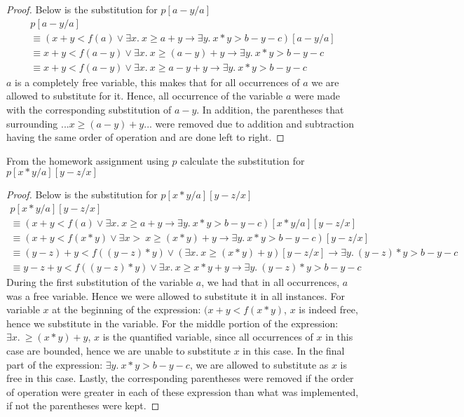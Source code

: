 \documentclass[12pt]{article}
\newenvironment{exercise}[2][Exercise]{\begin{trivlist}
\item[\hskip \labelsep {\bfseries #1}\hskip \labelsep {\bfseries #2.}]}{\end{trivlist}}
\begin{document}
\begin{proof}
Below is the substitution for $p[a-y/a]$
\begin{gather*}
    p[a-y/a] \\ 
     \equiv (x+y < f(a) \lor \exists x .\: x \geq a + y \rightarrow \exists y .\: x*y > b-y-c)[a-y/a] \\
     \equiv x+y < f(a-y) \lor \exists x .\: x \geq (a-y)+y \rightarrow \exists y .\: x*y > b-y-c \\ 
     \equiv x+y < f(a-y) \lor \exists x .\: x \geq a-y+y \rightarrow \exists y .\: x*y > b-y-c
\end{gather*}
$a$ is a completely free variable, this makes that for all occurrences of $a$ we are allowed to substitute for it. Hence, all occurrence of the variable $a$ were made with the corresponding substitution of $a-y$. In addition, the parentheses that surrounding $... x \geq (a-y) +y ...$ were removed due to addition and subtraction having the same order of operation and are done left to right. 
\end{proof}

\newpage 
\begin{exercise}{10}
From the homework assignment using $p$ calculate the substitution for $p[x*y/a][y-z/x]$
\end{exercise}

\begin{proof}
Below is the substitution for $p[x*y/a][y-z/x]$
\begin{gather*}
    p[x*y/a][y-z/x] \\
  \equiv (x+y < f(a) \lor \exists x .\: x \geq a + y \rightarrow \exists y .\: x*y > b-y-c)[x*y/a][y-z/x] \\ \equiv (x+y < f(x*y) \lor \exists x >\: x \geq (x*y) + y \rightarrow \exists y. \: x*y > b-y-c)[y-z/x] \\ 
  \equiv (y-z)+y < f((y-z)*y) \lor (\exists x .\: x \geq (x*y) + y)[y-z/x] \rightarrow \exists y .\: (y-z)*y > b-y-c \\ 
  \equiv y-z+y < f((y-z)*y) \lor \exists x .\: x \geq x*y +y \rightarrow \exists y .\: (y-z)*y > b-y-c
\end{gather*}
During the first substitution of the variable $a$, we had that in all occurrences, $a$ was a free variable. Hence we were allowed to substitute it in all instances. For variable $x$ at the beginning of the expression: $(x+y < f(x*y)$, $x$ is indeed free, hence we substitute in the variable. For the middle portion of the expression: $\exists x .\: \geq (x*y) + y$, $x$ is the quantified variable, since all occurrences of $x$ in this case are bounded, hence we are unable to substitute $x$ in this case. In the final part of the expression: $\exists y. \: x*y > b-y-c$, we are allowed to substitute as $x$ is free in this case. Lastly, the corresponding parentheses were removed if the order of operation were greater in each of these expression than what was implemented, if not the parentheses were kept.

\end{proof} 
\end{document}

